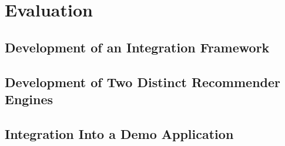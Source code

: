 \chapter{Evaluation}

\section{Development of an Integration Framework}

\section{Development of Two Distinct Recommender Engines}

\section{Integration Into a Demo Application}

